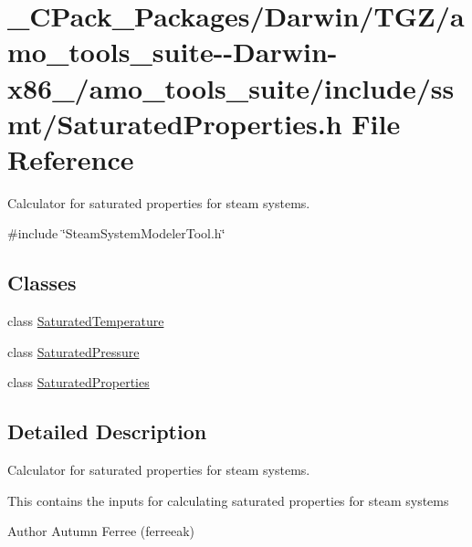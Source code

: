 \hypertarget{___c_pack___packages_2_darwin_2_t_g_z_2amo__tools__suite--_darwin-x86__64_2amo__tools__suite_2in32e5bb81fc599104242d28755f004b69}{}\section{\+\_\+\+C\+Pack\+\_\+\+Packages/\+Darwin/\+T\+G\+Z/amo\+\_\+tools\+\_\+suite-\/-\/\+Darwin-\/x86\+\_/amo\+\_\+tools\+\_\+suite/include/ssmt/\+Saturated\+Properties.h File Reference}
\label{___c_pack___packages_2_darwin_2_t_g_z_2amo__tools__suite--_darwin-x86__64_2amo__tools__suite_2in32e5bb81fc599104242d28755f004b69}


Calculator for saturated properties for steam systems.  


{\ttfamily \#include \char`\"{}Steam\+System\+Modeler\+Tool.\+h\char`\"{}}\newline
\subsection*{Classes}
\begin{DoxyCompactItemize}
\item 
class \hyperlink{class_saturated_temperature}{Saturated\+Temperature}
\item 
class \hyperlink{class_saturated_pressure}{Saturated\+Pressure}
\item 
class \hyperlink{class_saturated_properties}{Saturated\+Properties}
\end{DoxyCompactItemize}


\subsection{Detailed Description}
Calculator for saturated properties for steam systems. 

This contains the inputs for calculating saturated properties for steam systems

\begin{DoxyAuthor}{Author}
Autumn Ferree (ferreeak) 
\end{DoxyAuthor}
